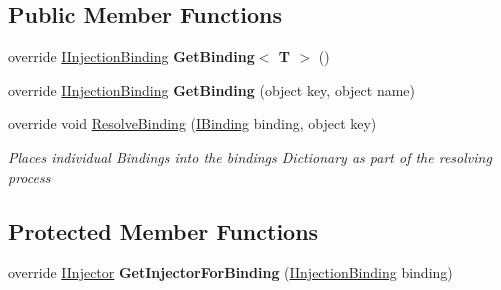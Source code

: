 \subsection*{Public Member Functions}
\begin{DoxyCompactItemize}
\item 
\hypertarget{classstrange_1_1extensions_1_1injector_1_1impl_1_1_cross_context_injection_binder_a46e2850751ef5b12efaa24945f3beedb}{override \hyperlink{interfacestrange_1_1extensions_1_1injector_1_1api_1_1_i_injection_binding}{I\-Injection\-Binding} {\bfseries Get\-Binding$<$ T $>$} ()}\label{classstrange_1_1extensions_1_1injector_1_1impl_1_1_cross_context_injection_binder_a46e2850751ef5b12efaa24945f3beedb}

\item 
\hypertarget{classstrange_1_1extensions_1_1injector_1_1impl_1_1_cross_context_injection_binder_a1f1987dd762c7feee56747cd4ceb7e90}{override \hyperlink{interfacestrange_1_1extensions_1_1injector_1_1api_1_1_i_injection_binding}{I\-Injection\-Binding} {\bfseries Get\-Binding} (object key, object name)}\label{classstrange_1_1extensions_1_1injector_1_1impl_1_1_cross_context_injection_binder_a1f1987dd762c7feee56747cd4ceb7e90}

\item 
override void \hyperlink{classstrange_1_1extensions_1_1injector_1_1impl_1_1_cross_context_injection_binder_ad93ea865f14a6249af575633f6472a7e}{Resolve\-Binding} (\hyperlink{interfacestrange_1_1framework_1_1api_1_1_i_binding}{I\-Binding} binding, object key)
\begin{DoxyCompactList}\small\item\em Places individual Bindings into the bindings Dictionary as part of the resolving process \end{DoxyCompactList}\end{DoxyCompactItemize}
\subsection*{Protected Member Functions}
\begin{DoxyCompactItemize}
\item 
\hypertarget{classstrange_1_1extensions_1_1injector_1_1impl_1_1_cross_context_injection_binder_a03faea5c258e2557cb67031d58df3041}{override \hyperlink{interfacestrange_1_1extensions_1_1injector_1_1api_1_1_i_injector}{I\-Injector} {\bfseries Get\-Injector\-For\-Binding} (\hyperlink{interfacestrange_1_1extensions_1_1injector_1_1api_1_1_i_injection_binding}{I\-Injection\-Binding} binding)}\label{classstrange_1_1extensions_1_1injector_1_1impl_1_1_cross_context_injection_binder_a03faea5c258e2557cb67031d58df3041}

\end{DoxyCompactItemize}
